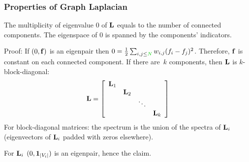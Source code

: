 \documentclass{beamer}
\begin{document}
\begin{frame}
\frametitle{Properties of Graph Laplacian}

\begin{block}{}
The multiplicity of eigenvalue 0 of $\mathbf{L}$ equals to the number of connected components.
The eigenspace of 0 is spanned by the components' indicators.
\end{block}
\pause
Proof: If $(0,\mathbf{f})$ is an eigenpair then $0 = \frac{1}{2}\sum_{i,j\leq \nodes}w_{i,j}(f_i-f_j)^2$.
\pause
Therefore, $\mathbf{f}$ is constant on each connected component.
\pause
If there are~$k$ components, then $\mathbf{L}$ is $k$-block-diagonal:
$$
 \mathbf{L} = 
\left[\begin{array}{cccc}
\mathbf{L}_{1}& &  &\\
&\mathbf{L}_{2}& & \\
& &\ddots & \\
& & &\mathbf{L}_{k}\\
\end{array}\right]
$$
\pause
For block-diagonal matrices: the spectrum is the union of the spectra of $\mathbf{L}_i$
\pause
(eigenvectors of $\mathbf{L}_i$ padded with zeros elsewhere).
\pause
\begin{flushright}
For $\mathbf{L}_i$ $(0,\mathbf{1}_{|V_i|})$ is an eigenpair, hence the claim.
\end{flushright}
\end{frame}








\MakeLastSlide
\end{document}
